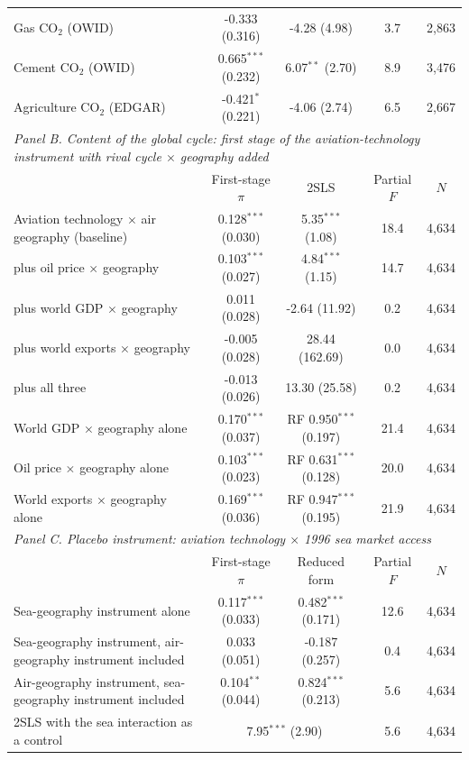 \documentclass[12pt]{article}
\begin{document}
\begin{table}[H]
{\begin{threeparttable}
\begin{tabular}{lcccc}
  Gas CO$_2$ (OWID) & -0.333 (0.316) & -4.28 (4.98) & 3.7 & 2,863 \\
  Cement CO$_2$ (OWID) & 0.665$^{***}$ (0.232) & 6.07$^{**}$ (2.70) & 8.9 & 3,476 \\
  Agriculture CO$_2$ (EDGAR) & -0.421$^{*}$ (0.221) & -4.06 (2.74) & 6.5 & 2,667 \\
\midrule
\multicolumn{5}{l}{\textit{Panel B. Content of the global cycle: first stage of the aviation-technology instrument with rival cycle $\times$ geography added}} \\
 & First-stage $\pi$ & 2SLS & Partial $F$ & $N$ \\
  Aviation technology $\times$ air geography (baseline) & 0.128$^{***}$ (0.030) & 5.35$^{***}$ (1.08) & 18.4 & 4,634 \\
  \quad plus oil price $\times$ geography & 0.103$^{***}$ (0.027) & 4.84$^{***}$ (1.15) & 14.7 & 4,634 \\
  \quad plus world GDP $\times$ geography & 0.011 (0.028) & -2.64 (11.92) & 0.2 & 4,634 \\
  \quad plus world exports $\times$ geography & -0.005 (0.028) & 28.44 (162.69) & 0.0 & 4,634 \\
  \quad plus all three & -0.013 (0.026) & 13.30 (25.58) & 0.2 & 4,634 \\
  World GDP $\times$ geography alone & 0.170$^{***}$ (0.037) & RF 0.950$^{***}$ (0.197) & 21.4 & 4,634 \\
  Oil price $\times$ geography alone & 0.103$^{***}$ (0.023) & RF 0.631$^{***}$ (0.128) & 20.0 & 4,634 \\
  World exports $\times$ geography alone & 0.169$^{***}$ (0.036) & RF 0.947$^{***}$ (0.195) & 21.9 & 4,634 \\
\midrule
\multicolumn{5}{l}{\textit{Panel C. Placebo instrument: aviation technology $\times$ 1996 sea market access}} \\
 & First-stage $\pi$ & Reduced form & Partial $F$ & $N$ \\
  Sea-geography instrument alone & 0.117$^{***}$ (0.033) & 0.482$^{***}$ (0.171) & 12.6 & 4,634 \\
  Sea-geography instrument, air-geography instrument included & 0.033 (0.051) & -0.187 (0.257) & 0.4 & 4,634 \\
  Air-geography instrument, sea-geography instrument included & 0.104$^{**}$ (0.044) & 0.824$^{***}$ (0.213) & 5.6 & 4,634 \\
  \quad 2SLS with the sea interaction as a control & \multicolumn{2}{c}{7.95$^{***}$ (2.90)} & 5.6 & 4,634 \\

\end{tabular}
\end{threeparttable}}
\end{table}
\end{document}

